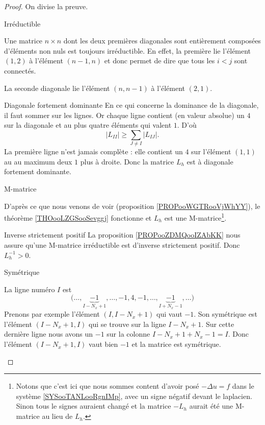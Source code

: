 \begin{proof}

    On divise la preuve.
    \begin{subproof}
        \item[Irréductible]

    Une matrice \( n\times n\) dont les deux premières diagonales sont entièrement composées d'éléments non nuls est toujours irréductible. En effet, la première lie l'élément \( (1,2)\) à l'élément \( (n-1,n)\) et donc permet de dire que tous les \( i<j\) sont connectés.

    La seconde diagonale lie l'élément \( (n,n-1)\) à l'élément \( (2,1)\).

        \item[Diagonale fortement dominante]
    En ce qui concerne la dominance de la diagonale, il faut sommer sur les lignes. Or chaque ligne contient (en valeur absolue) un \( 4\) sur la diagonale et au plus quatre éléments qui valent \( 1\). D'où
    \begin{equation}
        | L_{II} |\geq \sum_{J\neq I}| L_{IJ} |.
    \end{equation}
    La première ligne n'est jamais complète : elle contient un \( 4\) sur l'élément \( (1,1)\) au au maximum deux \( 1\) plus à droite. Donc la matrice \( L_h\) est à diagonale fortement dominante.

\item[M-matrice]

    D'après ce que nous venons de voir (proposition \ref{PROPooWGTRooVjWhYY}), le théorème \ref{THOooLZGSooSevggj} fonctionne et \( L_h\) est une M-matrice\footnote{Notons que c'est ici que nous sommes content d'avoir posé \( -\Delta u=f\) dans le système \eqref{SYSooTANLooRgnIMp}, avec un signe négatif devant le laplacien. Sinon tous le signes auraient changé et la matrice \( -L_h\) aurait été une M-matrice au lieu de \( L_h\).}.

\item[Inverse strictement positif]
    La proposition \ref{PROPooZDMQooIZAbKK} nous assure qu'une M-matrice irréductible est d'inverse strictement positif. Donc \( L_h^{-1}>0\).
\item[Symétrique]

    La ligne numéro \( I\) est 
    \begin{equation}
        \big( \ldots ,\underbrace{-1}_{I-N_x+1},\ldots,-1,4,-1,\ldots,\underbrace{-1}_{I+N_x-1},\ldots \big)
    \end{equation}
    Prenons par exemple l'élément \( (I,I-N_x+1)\) qui vaut \( -1\). Son symétrique est l'élément \( (I-N_x+1,I)\) qui se trouve sur la ligne \( I-N_x+1\). Sur cette dernière ligne nous avons un \( -1\) sur la colonne \( I-N_x+1+N_x-1=I\). Donc l'élément \( (I-N_x+1,I)\) vaut bien \( -1\) et la matrice est symétrique.


\end{subproof}
\end{proof}
